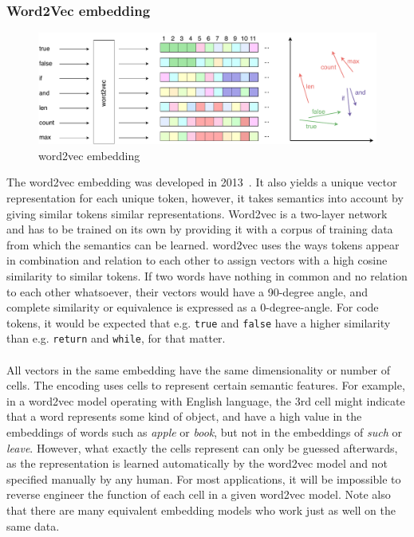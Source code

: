 \documentclass[
	a4paper,
	pagesize,
	pdftex,
	12pt,
	twoside, %
	BCOR=5mm, %
	ngerman,
	fleqn,
	final,
	]{scrartcl}
\begin{document}
\subsubsection{Word2Vec embedding}\label{word2vec}
\begin{figure}[ht]
	\centering
	\includegraphics[width=\linewidth]{img/word2vecEmbedding}
	\caption{word2vec embedding}
	\label{fig:word2vecEmbedding}
\end{figure}
The word2vec embedding was developed in 2013~\cite{Mikolov.2013}. It also yields a unique vector representation for each unique token, however, it takes semantics into account by giving similar tokens similar representations. Word2vec is a two-layer network and has to be trained on its own by providing it with a corpus of training data from which the semantics can be learned. word2vec uses the ways tokens appear in combination and relation to each other to assign vectors with a high cosine similarity to similar tokens. If two words have nothing in common and no relation to each other whatsoever, their vectors would have a 90-degree angle, and complete similarity or equivalence is expressed as a 0-degree-angle. For code tokens, it would be expected that e.g. \texttt{true} and \texttt{false} have a higher similarity than e.g. \texttt{return} and \texttt{while}, for that matter.\\\\
All vectors in the same embedding have the same dimensionality or number of cells. The encoding uses cells to represent certain semantic features. For example, in a word2vec model operating with English language, the 3rd cell might indicate that a word represents some kind of object, and have a high value in the embeddings of words such as \textit{apple} or \textit{book}, but not in the embeddings of \textit{such} or \textit{leave}. However, what exactly the cells represent can only be guessed afterwards, as the representation is learned automatically by the word2vec model and not specified manually by any human. For most applications, it will be impossible to reverse engineer the function of each cell in a given word2vec model. Note also that there are many equivalent embedding models who work just as well on the same data.\\ 
\end{document}
